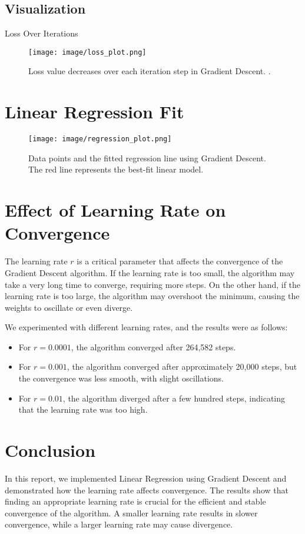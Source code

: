 \documentclass[hidelinks]{report}
\begin{document}
\subsection{Visualization}
Loss Over Iterations
\begin{figure}[H]
    \centering
    \texttt{[image: image/loss\_plot.png]}
    \caption{Loss value decreases over each iteration step in Gradient Descent. .}
    \label{fig:loss-plot}
\end{figure}

\section{Linear Regression Fit}
\begin{figure}[H]
    \centering
    \texttt{[image: image/regression\_plot.png]}
    \caption{Data points and the fitted regression line using Gradient Descent. The red line represents the best-fit linear model.}
    \label{fig:regression-plot}
\end{figure}

\section{Effect of Learning Rate on Convergence}
The learning rate \(r\) is a critical parameter that affects the convergence of the Gradient Descent algorithm. If the learning rate is too small, the algorithm may take a very long time to converge, requiring more steps. On the other hand, if the learning rate is too large, the algorithm may overshoot the minimum, causing the weights to oscillate or even diverge.

We experimented with different learning rates, and the results were as follows:

\begin{itemize}
    \item For \(r = 0.0001\), the algorithm converged after 264,582 steps.
    \item For \(r = 0.001\), the algorithm converged after approximately 20,000 steps, but the convergence was less smooth, with slight oscillations.
    \item For \(r = 0.01\), the algorithm diverged after a few hundred steps, indicating that the learning rate was too high.
\end{itemize}

\section{Conclusion}
In this report, we implemented Linear Regression using Gradient Descent and demonstrated how the learning rate affects convergence. The results show that finding an appropriate learning rate is crucial for the efficient and stable convergence of the algorithm. A smaller learning rate results in slower convergence, while a larger learning rate may cause divergence.
\end{document}
